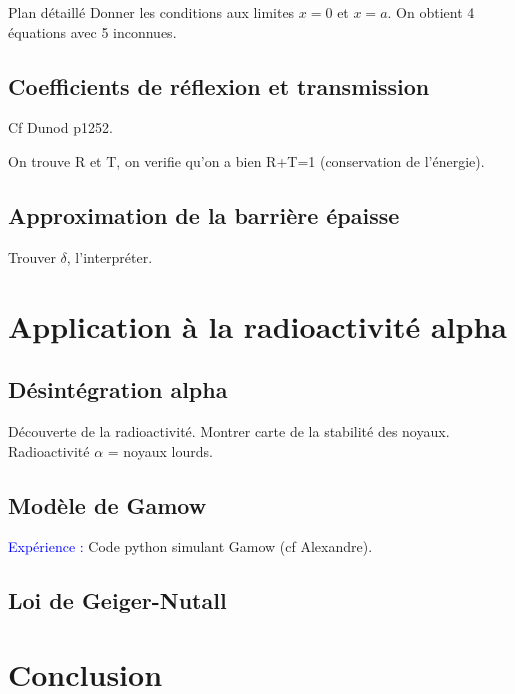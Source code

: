 \begin{reportBlock}{Plan détaillé}
Donner les conditions aux limites $x=0$ et $x=a$. On obtient 4 équations avec 5 inconnues.



\subsection{Coefficients de réflexion et transmission}
Cf Dunod p1252.


On trouve R et T, on verifie qu'on a bien R+T=1 (conservation de l'énergie).

\subsection{Approximation de la barrière épaisse}
Trouver $\delta$, l'interpréter.

\section{Application à la radioactivité alpha}

\subsection{Désintégration alpha}
Découverte de la radioactivité. Montrer carte de la stabilité des noyaux. Radioactivité $\alpha$ = noyaux lourds.
\subsection{Modèle de Gamow}
\textcolor{blue}{Expérience :} Code python simulant Gamow (cf Alexandre).

\subsection{Loi de Geiger-Nutall}


\section*{Conclusion}


\end{reportBlock}